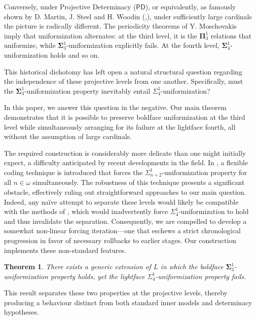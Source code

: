 \documentclass{article}
\theoremstyle{plain}
\newtheorem{theorem}{Theorem}[section]
\theoremstyle{definition}
\begin{document}
Conversely, under Projective Determinacy ($\mathsf{PD}$), or equivalently, as famously shown by D. Martin, J. Steel and H. Woodin (\cite{MS},\cite{muller2020mice}), under sufficiently large cardinals the picture is radically different. The periodicity theorems of Y. Moschovakis \cite{moschovakis2025descriptive} imply that uniformization alternates: at the third level, it is the $\mathbf{\Pi}^1_3$ relations that uniformize, while $\mathbf{\Sigma}^1_3$-uniformization explicitly fails. At the fourth level, $\mathbf{\Sigma}^1_4$-uniformization holds and so on. 

This historical dichotomy has left open a natural structural question regarding the independence of these projective levels from one another. Specifically, must the $\mathbf{\Sigma}^1_3$-uniformization property inevitably entail ${\Sigma}^1_4$-uniformization?

In this paper, we answer this question in the negative.  Our main theorem demonstrates that it is possible to  preserve boldface uniformization at the third level while simultaneously arranging for its failure at the lightface fourth, all without the assumption of large cardinals.

The required construction is considerably more delicate than one might initially expect, a difficulty anticipated by recent developments in the field. In \cite{HOFFELNER2025110272}, a flexible coding technique is introduced that forces the $\Sigma^1_{n+2}$-uniformization property for all $n \in \omega$ simultaneously. The robustness of this technique presents a significant obstacle, effectively ruling out straightforward approaches to our main question. Indeed, any naïve attempt to separate these levels would likely be compatible with the methods of \cite{HOFFELNER2025110272}, which would inadvertently force $\Sigma^1_4$-uniformization to hold and thus invalidate the separation. Consequently, we are compelled to develop a somewhat non-linear forcing iteration---one that eschews a strict chronological progression in favor of necessary rollbacks to earlier stages. Our construction implements these non-standard features.

\begin{theorem}
    There exists a generic extension of $L$ in which the boldface $\mathbf{\Sigma}^1_3$-uniformization property holds, yet the lightface $\Sigma^1_4$-uniformization property fails.
\end{theorem}

This result separates these two properties at the projective levels, thereby producing a behaviour distinct from both standard inner models and determinacy hypotheses.
\end{document}
